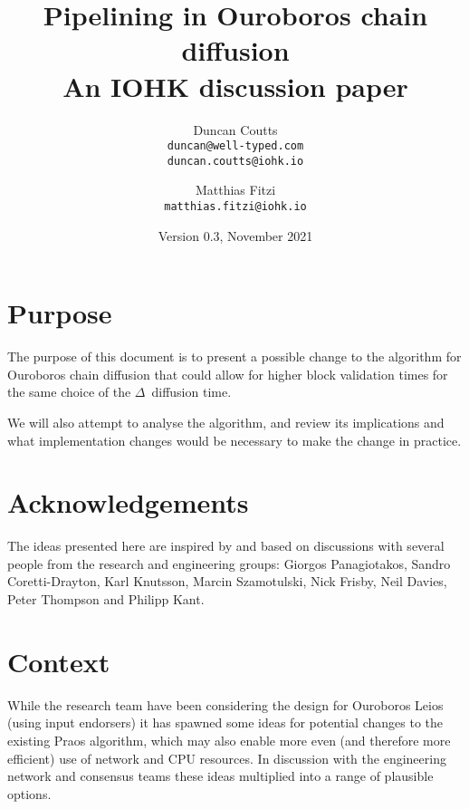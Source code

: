 \documentclass[11pt,a4paper]{article}
\begin{document}
\title{Pipelining in Ouroboros chain diffusion\\
       {\large \sc An IOHK discussion paper}}
\date{Version 0.3, November 2021}
\author{Duncan Coutts      \\ {\small \texttt{duncan@well-typed.com}} \\
                              {\small \texttt{duncan.coutts@iohk.io}} \\
   \and Matthias Fitzi     \\ {\small \texttt{matthias.fitzi@iohk.io}}
   }

\maketitle

\section{Purpose}

The purpose of this document is to present a possible change to the algorithm
for Ouroboros chain diffusion that could allow for higher block validation times
for the same choice of the $\Delta$~diffusion time.

We will also attempt to analyse the algorithm, and review its implications and
what implementation changes would be necessary to make the change in practice.

\tableofcontents

\section{Acknowledgements}

The ideas presented here are inspired by and based on discussions with several
people from the research and engineering groups: Giorgos Panagiotakos,
Sandro Coretti-Drayton, Karl Knutsson, Marcin Szamotulski, Nick Frisby,
Neil Davies, Peter Thompson and Philipp Kant.

\section{Context}

While the research team have been considering the design for Ouroboros Leios
(using input endorsers) it has spawned some ideas for potential changes to
the existing Praos algorithm, which may also enable more even (and therefore
more efficient) use of network and CPU resources. In discussion with the
engineering network and consensus teams these ideas multiplied into a range of
plausible options.
\end{document}
